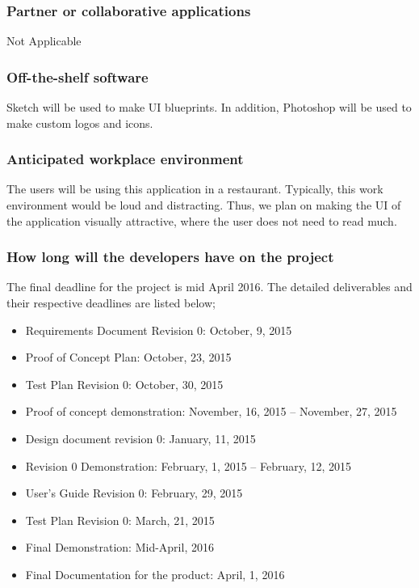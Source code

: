 \documentclass[12pt, titlepage]{article}
\begin{document}
\subsubsection{Partner or collaborative applications}
Not Applicable \newline\newline

\subsubsection{Off-the-shelf software}
Sketch will be used to make UI blueprints. In addition, Photoshop will be used to make custom logos and icons. \newline\newline

\subsubsection{Anticipated workplace environment}
The users will be using this application in a restaurant. Typically, this work environment would be loud and distracting. Thus, we plan on making the UI of the application visually attractive, where the user does not need to read much.  \newline\newline

\subsubsection{How long will the developers have on the project}
The final deadline for the project is mid April 2016. The detailed deliverables and their respective deadlines are listed below;
\begin{itemize}
  \item Requirements Document Revision 0: October, 9, 2015 
  \item Proof of Concept Plan: October, 23, 2015
  \item 	Test Plan Revision 0: October, 30, 2015
  \item 	Proof of concept demonstration: November, 16, 2015  – November, 27, 2015
  \item Design document revision 0: January, 11, 2015
  \item Revision 0 Demonstration: February, 1, 2015  – February, 12, 2015
  \item User’s Guide Revision 0: February, 29, 2015
  \item 	Test Plan Revision 0: March, 21, 2015
  \item Final Demonstration: Mid-April, 2016
  \item 	Final Documentation for the product: April, 1, 2016
\end{itemize}
\end{document}
